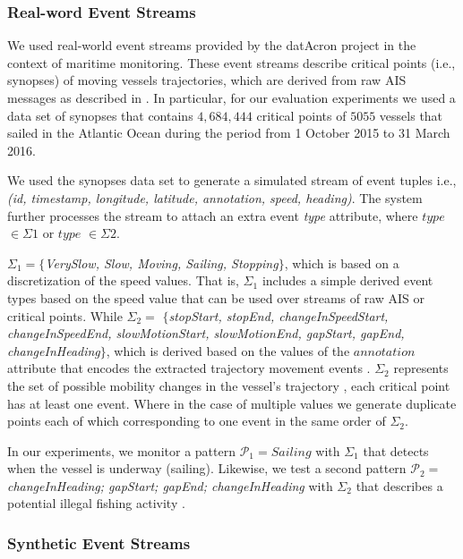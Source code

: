 \subsubsection*{Real-word Event Streams}
We used real-world event streams provided by the datAcron project in the context of maritime monitoring. These event streams describe critical points (i.e., synopses) of moving vessels trajectories, which are derived from raw AIS messages as described in \cite{synopses1}. In particular, for our evaluation experiments we used a data set of synopses that contains $4,684,444$ critical points of $5055$ vessels that sailed in the Atlantic Ocean during the period from 1 October 2015 to 31 March 2016.

\par We used the synopses data set to generate a simulated stream of event tuples  i.e., \textit{(id, timestamp, longitude, latitude, annotation, speed, heading)}. The  system further processes the stream to attach an extra event \textit{type} attribute,  where $type$ $\in \Sigma1$ or $type$ $\in \Sigma2$.


\par $\Sigma_1=$$\{$\textit{VerySlow, Slow, Moving,  Sailing, Stopping}$\}$, which is based on a discretization of the speed values. That is, $\Sigma_1$ includes a simple derived event types based on the speed value that can be used over streams of  raw AIS  or critical points. While $\Sigma_2=$ $\{$\textit{stopStart, stopEnd, changeInSpeedStart, changeInSpeedEnd,  slowMotionStart, slowMotionEnd, gapStart, gapEnd, changeInHeading}$\}$, which is derived based on the values of the $annotation$ attribute that encodes the extracted trajectory movement events \cite{synopses1}. $\Sigma_2$ represents the set of possible mobility changes in the vessel's trajectory \cite{synopses1}, each critical point has at least one event. Where in the case of multiple values we generate duplicate points each of which corresponding to one event in the same order of $\Sigma_2$.

\par In our experiments, we monitor a pattern $\mathcal{P}_1=Sailing$ with $\Sigma_1$ that detects when the vessel is underway (sailing). Likewise, we test a second pattern  $\mathcal{P}_2=$\textit{changeInHeading; gapStart; gapEnd; changeInHeading} with $\Sigma_2$ that describes a potential illegal fishing activity \cite{alevizos2017event}. 


\subsubsection*{Synthetic Event Streams}

